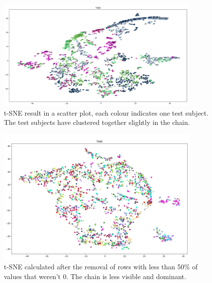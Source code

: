 \begin{figure}[h]
  \centering
  \includegraphics[width=0.9\textwidth]{./images/tsneTestSubjectsColor.png}
  \caption{t-SNE result in a scatter plot, each colour indicates one test subject. The test subjects have clustered together slightly in the chain.}
  \label{figure:tsneTestSubjectsColor}
\end{figure}

\begin{figure}[h]
  \centering
  \includegraphics[width=0.9\textwidth]{./images/tsneAfterChainRemoved(50Percent).png}
  \caption{t-SNE calculated after the removal of rows with less than 50\% of values that weren't 0. The chain is less visible and dominant.}
  \label{figure:tsneAfterChainRemoved(50Percent)}
\end{figure}


